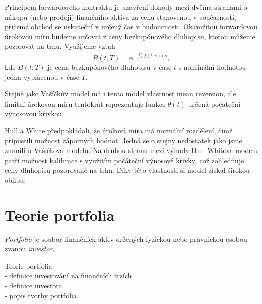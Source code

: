 \documentclass[a4paper,12pt]{report}
\theoremstyle{definition} \newtheorem{definice}[veta]{Definice}
\theoremstyle{remark}
\begin{document}
Principem forwardového kontraktu je uzavření dohody mezi dvěma stranami o nákupu (nebo prodeji) finančního aktiva za cenu stanovenou v současnosti, přičemž obchod se uskuteční v určený čas v budoucnosti. 
Okamžitou forwardovou úrokovou míru budeme určovat z ceny bezkupónového dluhopisu, kterou můžeme pozorovat na trhu.
Využijeme vztah
\begin{equation}
B(t,T)=\mathrm{e}^{-\int_{t}^T f(t,s)\,\mathrm{d}s},
\end{equation}
kde $B(t,T)$ je cena bezkupónového dluhopisu v čase $t$ s nominální hodnotou jedna vyplácenou v čase $T$.

Stejně jako Vašíčkův model má i tento model vlastnost mean reversion, ale limitní úrokovou míru tentokrát reprezentuje funkce $\theta(t)$ určená počáteční výnosovou křivkou.

Hull a White předpokládali, že úroková míra má normální rozdělení, čímž připustili možnost záporných hodnot.
Jedná se o stejný nedostatek jako jsme zmínili u Vašíčkova modelu.
Na druhou stranu mezi výhody Hull-Whitova modelu patří možnost kalibrace s využitím počáteční výnosové křivky, což zohledňuje ceny dluhopisů pozorované na trhu.
Díky této vlastnosti si model získal širokou oblibu.


\chapter{Teorie portfolia}
\textit{Portfolio} je soubor finančních aktiv držených fyzickou nebo právnickou osobou zvanou \textit{investor}.

Teorie portfolia\\
- definice investování na finančních trzích\\
- definice investora\\
- popis tvorby portfolia\\
\end{document}
